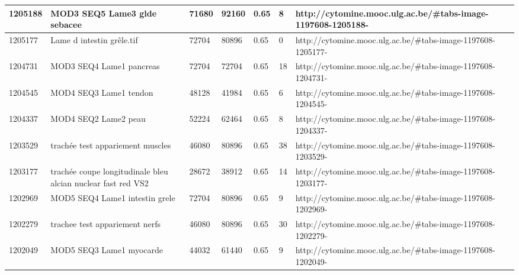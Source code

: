 \documentclass[a4paper,11pt]{report}
\numberwithin{figure}{chapter} %
\begin{document}
\begin{table}[]
{\begin{tabular}{|l|l|l|l|l|l|l|}
1205188  & MOD3 SEQ5 Lame3 glde sebacee                                                                 & 71680  & 92160  & 0.65                  & 8           & http://cytomine.mooc.ulg.ac.be/\#tabs-image-1197608-1205188-  \\ \hline
1205177  & Lame d intestin gr\^{e}le.tif                                                                    & 72704  & 80896  & 0.65                  & 0           & http://cytomine.mooc.ulg.ac.be/\#tabs-image-1197608-1205177-  \\ \hline
1204731  & MOD3 SEQ4 Lame1 pancreas                                                                     & 72704  & 72704  & 0.65                  & 18          & http://cytomine.mooc.ulg.ac.be/\#tabs-image-1197608-1204731-  \\ \hline
1204545  & MOD4 SEQ3 Lame1 tendon                                                                       & 48128  & 41984  & 0.65                  & 6           & http://cytomine.mooc.ulg.ac.be/\#tabs-image-1197608-1204545-  \\ \hline
1204337  & MOD4 SEQ2 Lame2 peau                                                                         & 52224  & 62464  & 0.65                  & 8           & http://cytomine.mooc.ulg.ac.be/\#tabs-image-1197608-1204337-  \\ \hline
1203529  & trach\'{e}e test appariement muscles                                                             & 46080  & 80896  & 0.65                  & 38          & http://cytomine.mooc.ulg.ac.be/\#tabs-image-1197608-1203529-  \\ \hline
1203177  & trach\'{e}e coupe longitudinale bleu alcian nuclear fast red VS2                                 & 28672  & 38912  & 0.65                  & 14          & http://cytomine.mooc.ulg.ac.be/\#tabs-image-1197608-1203177-  \\ \hline
1202969  & MOD5 SEQ4 Lame1 intestin grele                                                               & 72704  & 80896  & 0.65                  & 9           & http://cytomine.mooc.ulg.ac.be/\#tabs-image-1197608-1202969-  \\ \hline
1202279  & trachee test appariement nerfs                                                               & 46080  & 80896  & 0.65                  & 30          & http://cytomine.mooc.ulg.ac.be/\#tabs-image-1197608-1202279-  \\ \hline
1202049  & MOD5 SEQ3 Lame1 myocarde                                                                     & 44032  & 61440  & 0.65                  & 9           & http://cytomine.mooc.ulg.ac.be/\#tabs-image-1197608-1202049-  \\ \hline

\end{tabular}}
\end{table}
\end{document}
